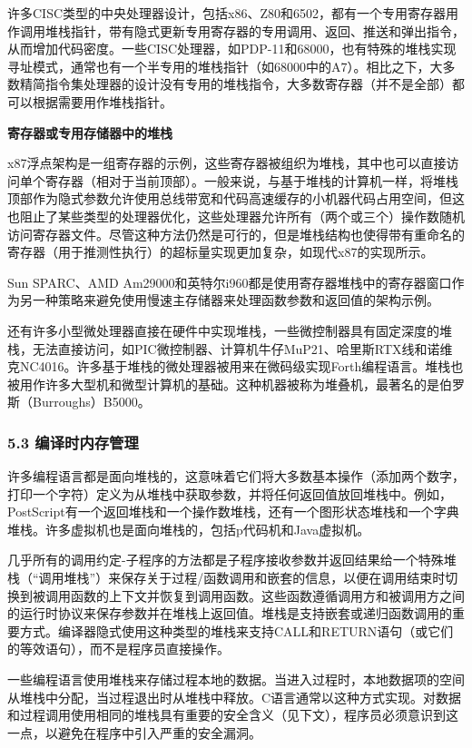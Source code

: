 许多CISC类型的中央处理器设计，包括x86、Z80和6502，都有一个专用寄存器用作调用堆栈指针，带有隐式更新专用寄存器的专用调用、返回、推送和弹出指令，从而增加代码密度。一些CISC处理器，如PDP-11和68000，也有特殊的堆栈实现寻址模式，通常也有一个半专用的堆栈指针（如68000中的A7）。相比之下，大多数精简指令集处理器的设计没有专用的堆栈指令，大多数寄存器（并不是全部）都可以根据需要用作堆栈指针。

\textbf{寄存器或专用存储器中的堆栈}

x87浮点架构是一组寄存器的示例，这些寄存器被组织为堆栈，其中也可以直接访问单个寄存器（相对于当前顶部）。一般来说，与基于堆栈的计算机一样，将堆栈顶部作为隐式参数允许使用总线带宽和代码高速缓存的小机器代码占用空间，但这也阻止了某些类型的处理器优化，这些处理器允许所有（两个或三个）操作数随机访问寄存器文件。尽管这种方法仍然是可行的，但是堆栈结构也使得带有重命名的寄存器（用于推测性执行）的超标量实现更加复杂，如现代x87的实现所示。

Sun SPARC、AMD Am29000和英特尔i960都是使用寄存器堆栈中的寄存器窗口作为另一种策略来避免使用慢速主存储器来处理函数参数和返回值的架构示例。

还有许多小型微处理器直接在硬件中实现堆栈，一些微控制器具有固定深度的堆栈，无法直接访问，如PIC微控制器、计算机牛仔MuP21、哈里斯RTX线和诺维克NC4016。许多基于堆栈的微处理器被用来在微码级实现Forth编程语言。堆栈也被用作许多大型机和微型计算机的基础。这种机器被称为堆叠机，最著名的是伯罗斯（Burroughs）B5000。

\subsubsection{5.3 编译时内存管理}
许多编程语言都是面向堆栈的，这意味着它们将大多数基本操作（添加两个数字，打印一个字符）定义为从堆栈中获取参数，并将任何返回值放回堆栈中。例如，PostScript有一个返回堆栈和一个操作数堆栈，还有一个图形状态堆栈和一个字典堆栈。许多虚拟机也是面向堆栈的，包括p代码机和Java虚拟机。

几乎所有的调用约定-子程序的方法都是子程序接收参数并返回结果给一个特殊堆栈（“调用堆栈”）来保存关于过程/函数调用和嵌套的信息，以便在调用结束时切换到被调用函数的上下文并恢复到调用函数。这些函数遵循调用方和被调用方之间的运行时协议来保存参数并在堆栈上返回值。堆栈是支持嵌套或递归函数调用的重要方式。编译器隐式使用这种类型的堆栈来支持CALL和RETURN语句（或它们的等效语句），而不是程序员直接操作。

一些编程语言使用堆栈来存储过程本地的数据。当进入过程时，本地数据项的空间从堆栈中分配，当过程退出时从堆栈中释放。C语言通常以这种方式实现。对数据和过程调用使用相同的堆栈具有重要的安全含义（见下文），程序员必须意识到这一点，以避免在程序中引入严重的安全漏洞。

